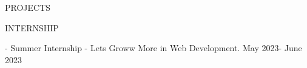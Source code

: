 \documentclass{resume} %
\begin{document}
\begin{rSection}{PROJECTS}

\begin{rSection}{INTERNSHIP} 

{- Summer Internship - Lets Groww More in Web Development.} \hfill May 2023- June 2023\\ 

\end{rSection} 







\end{rSection}
\end{document}
